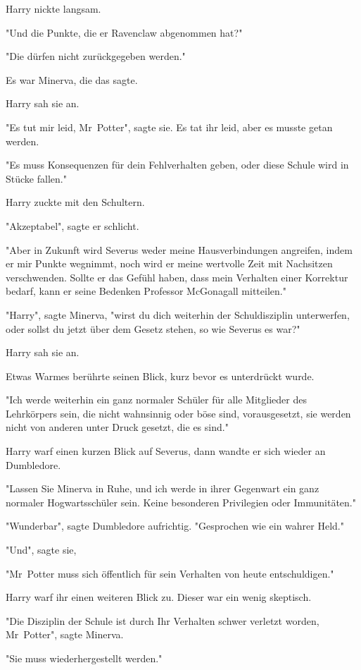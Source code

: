 {Harry nickte langsam.

"Und die Punkte, die er Ravenclaw abgenommen hat?"

"Die dürfen nicht zurückgegeben werden."

Es war Minerva, die das sagte.

Harry sah sie an.

"Es tut mir leid, Mr~Potter", sagte sie. Es tat ihr leid, aber es musste getan werden.

"Es muss Konsequenzen für dein Fehlverhalten geben, oder diese Schule wird in Stücke fallen."

Harry zuckte mit den Schultern.

"Akzeptabel", sagte er schlicht.

"Aber in Zukunft wird Severus weder meine Hausverbindungen angreifen, indem er mir Punkte wegnimmt, noch wird er meine wertvolle Zeit mit Nachsitzen verschwenden. Sollte er das Gefühl haben, dass mein Verhalten einer Korrektur bedarf, kann er seine Bedenken Professor McGonagall mitteilen."

"Harry", sagte Minerva, "wirst du dich weiterhin der Schuldisziplin unterwerfen, oder sollst du jetzt über dem Gesetz stehen, so wie Severus es war?"

Harry sah sie an.

Etwas Warmes berührte seinen Blick, kurz bevor es unterdrückt wurde.

"Ich werde weiterhin ein ganz normaler Schüler für alle Mitglieder des Lehrkörpers sein, die nicht wahnsinnig oder böse sind, vorausgesetzt, sie werden nicht von anderen unter Druck gesetzt, die es sind."

Harry warf einen kurzen Blick auf Severus, dann wandte er sich wieder an Dumbledore.

"Lassen Sie Minerva in Ruhe, und ich werde in ihrer Gegenwart ein ganz normaler Hogwartsschüler sein. Keine besonderen Privilegien oder Immunitäten."

"Wunderbar", sagte Dumbledore aufrichtig. "Gesprochen wie ein wahrer Held."

"Und", sagte sie,

"Mr~Potter muss sich öffentlich für sein Verhalten von heute entschuldigen."

Harry warf ihr einen weiteren Blick zu. Dieser war ein wenig skeptisch.

"Die Disziplin der Schule ist durch Ihr Verhalten schwer verletzt worden, Mr~Potter", sagte Minerva.

"Sie muss wiederhergestellt werden."

}
